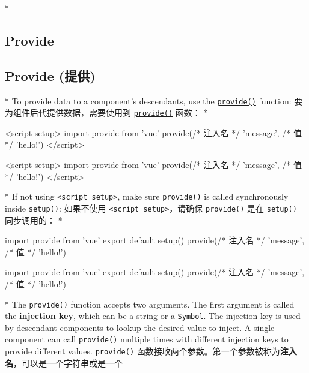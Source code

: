 \begin{paracol}{2}
 
\switchcolumn[0]*%
\subsection{Provide}
\switchcolumn
\subsection{Provide (提供)}
\switchcolumn[0]*%
To provide data to a component's descendants, use the
\href{https://vuejs.org/api/composition-api-dependency-injection.html\#provide}{\texttt{provide()}}
function:
\switchcolumn
要为组件后代提供数据，需要使用到
\href{https://cn.vuejs.org/api/composition-api-dependency-injection.html\#provide}{\texttt{provide()}}
函数：
\switchcolumn[0]*%
\begin{codeHtml}
<script setup>
import { provide } from 'vue'
provide(/* 注入名 */ 'message', /* 值 */ 'hello!')
</script>
\end{codeHtml}
\switchcolumn
\begin{codeHtml}
<script setup>
import { provide } from 'vue'
provide(/* 注入名 */ 'message', /* 值 */ 'hello!')
</script>
\end{codeHtml}
\switchcolumn[0]*%
If not using \texttt{\textless{}script\ setup\textgreater{}}, make sure
\texttt{provide()} is called synchronously inside \texttt{setup()}:
\switchcolumn
如果不使用 \texttt{\textless{}script\ setup\textgreater{}}，请确保
\texttt{provide()} 是在 \texttt{setup()} 同步调用的：
\switchcolumn[0]*%
\begin{codeJs}
import { provide } from 'vue'
export default {
  setup() {
    provide(/* 注入名 */ 'message', /* 值 */ 'hello!')
  }
}
\end{codeJs}
\switchcolumn
\begin{codeJs}
import { provide } from 'vue'
export default {
  setup() {
    provide(/* 注入名 */ 'message', /* 值 */ 'hello!')
  }
}
\end{codeJs}
\switchcolumn[0]*%
The \texttt{provide()} function accepts two arguments. The first
argument is called the \textbf{injection key}, which can be a string or
a \texttt{Symbol}. The injection key is used by descendant components to
lookup the desired value to inject. A single component can call
\texttt{provide()} multiple times with different injection keys to
provide different values.
\switchcolumn
\texttt{provide()}
函数接收两个参数。第一个参数被称为\textbf{注入名}，可以是一个字符串或是一个

\end{paracol}
